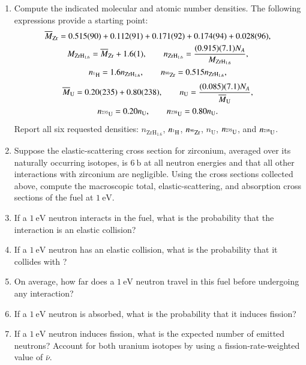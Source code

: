 \begin{enumerate}[label=(\alph*)]
\item Compute the indicated molecular and atomic number densities.  The
following expressions provide a starting point:
\[
\begin{gathered}
\overline M_{\mathrm{Zr}}
=0.515(90)+0.112(91)+0.171(92)+0.174(94)+0.028(96),\\
M_{\mathrm{ZrH}_{1.6}}=\overline M_{\mathrm{Zr}}+1.6(1),\qquad
n_{\mathrm{ZrH}_{1.6}}
=\frac{(0.915)(7.1)N_A}{M_{\mathrm{ZrH}_{1.6}}},\\
n_{\isoA{H}{1}}=1.6n_{\mathrm{ZrH}_{1.6}},\qquad
n_{\isoA{Zr}{90}}=0.515n_{\mathrm{ZrH}_{1.6}},\\[2pt]
\overline M_{\mathrm U}=0.20(235)+0.80(238),\qquad
n_{\mathrm U}=\frac{(0.085)(7.1)N_A}{\overline M_{\mathrm U}},\\
n_{\isoA{U}{235}}=0.20n_{\mathrm U},\qquad
n_{\isoA{U}{238}}=0.80n_{\mathrm U}.
\end{gathered}
\]
Report all six requested densities: $n_{\mathrm{ZrH}_{1.6}}$,
$n_{\isoA{H}{1}}$, $n_{\isoA{Zr}{90}}$, $n_{\mathrm U}$,
$n_{\isoA{U}{235}}$, and $n_{\isoA{U}{238}}$.
\item Suppose the elastic-scattering cross section for zirconium, averaged
over its naturally occurring isotopes, is $6~\mathrm b$ at all neutron
energies and that all other interactions with zirconium are negligible.
Using the cross sections collected above, compute the macroscopic total,
elastic-scattering, and absorption cross sections of the fuel at $1~\mathrm{eV}$.
\item If a $1~\mathrm{eV}$ neutron interacts in the fuel, what is the
probability that the interaction is an elastic collision?
\item If a $1~\mathrm{eV}$ neutron has an elastic collision, what is the
probability that it collides with ?
\item On average, how far does a $1~\mathrm{eV}$ neutron travel in this fuel
before undergoing any interaction?
\item If a $1~\mathrm{eV}$ neutron is absorbed, what is the probability that
it induces fission?
\item If a $1~\mathrm{eV}$ neutron induces fission, what is the expected
number of emitted neutrons?  Account for both uranium isotopes by using a
fission-rate-weighted value of $\bar\nu$.
\end{enumerate}

